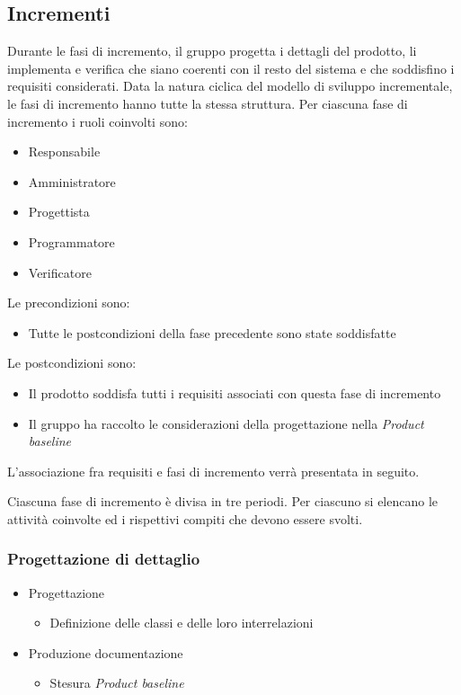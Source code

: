 \documentclass[../piano-di-progetto.tex]{subfiles}
\begin{document}
\subsection{Incrementi}%
\label{sub:incrementi}
Durante le fasi di incremento, il gruppo progetta i dettagli del prodotto, li implementa e verifica che siano coerenti con il resto del sistema e che soddisfino i requisiti considerati.
Data la natura ciclica del modello di sviluppo incrementale, le fasi di incremento hanno tutte la stessa struttura. Per ciascuna fase di incremento i ruoli coinvolti sono:
\begin{itemize}
  \item Responsabile
  \item Amministratore
  \item Progettista
  \item Programmatore
  \item Verificatore
\end{itemize}
Le precondizioni sono:
\begin{itemize}
  \item Tutte le postcondizioni della fase precedente sono state soddisfatte
\end{itemize}
Le postcondizioni sono:
\begin{itemize}
  \item Il prodotto soddisfa tutti i requisiti associati con questa fase di incremento
  \item Il gruppo ha raccolto le considerazioni della progettazione nella \textit{Product baseline}
\end{itemize}
L'associazione fra requisiti e fasi di incremento verrà presentata in seguito.\par
Ciascuna fase di incremento è divisa in tre periodi.
Per ciascuno si elencano le attività coinvolte ed i rispettivi compiti che devono essere svolti.
\subsubsection{Progettazione di dettaglio}%
\label{subs:progettazione_di_dettaglio}
\begin{itemize}
  \item Progettazione
  \begin{itemize}
    \item Definizione delle classi e delle loro interrelazioni
  \end{itemize}
  \item Produzione documentazione
  \begin{itemize}
    \item Stesura \textit{Product baseline}
  \end{itemize}
\end{itemize}
\end{document}
